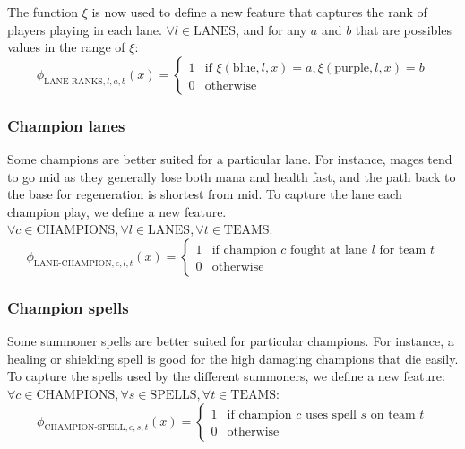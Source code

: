 The function $\xi$ is now used to define a new feature that captures the rank of players playing in each lane.
$\forall l \in \text{LANES}$, and for any $a$ and $b$ that are possibles values in the range of $\xi$:
\begin{equation}\label{eq:laneranks}
\phi_{\text{LANE-RANKS},l,a,b}(x) =
\begin{cases} 
  1 & \text{if } \xi(\text{blue},l,x) = a, \xi(\text{purple},l,x) = b\\
  0 & \text{otherwise} 
\end{cases}  
\end{equation}

\subsubsection{Champion lanes}
Some champions are better suited for a particular lane. For instance, mages tend to go mid as they generally lose both mana and health fast, and the path back to the base for regeneration is shortest from mid. To capture the lane each champion play, we define a new feature.
$\forall c \in \text{CHAMPIONS}, \forall l \in \text{LANES}, \forall t \in \text{TEAMS}$:
\begin{equation}\label{eq:championlane}
  \phi_{\text{LANE-CHAMPION},c,l,t}(x) =
\begin{cases}
  1 & \text{if champion } c \text{ fought at lane } l \text{ for team } t\\
  0 & \text{otherwise}
\end{cases}
\end{equation}

\subsubsection{Champion spells}
Some summoner spells are better suited for particular champions. For instance, a healing or shielding spell is good for the high damaging champions that die easily.
To capture the spells used by the different summoners, we define a new feature:
$\forall c \in \text{CHAMPIONS}, \forall s \in \text{SPELLS}, \forall t \in \text{TEAMS}$:
\begin{equation}\label{eq:championspell}
  \phi_{\text{CHAMPION-SPELL},c,s,t}(x) =
\begin{cases} 
  1 & \text{if champion } c \text{ uses spell } s \text{ on team } t\\
  0 & \text{otherwise} 
\end{cases}
\end{equation}

